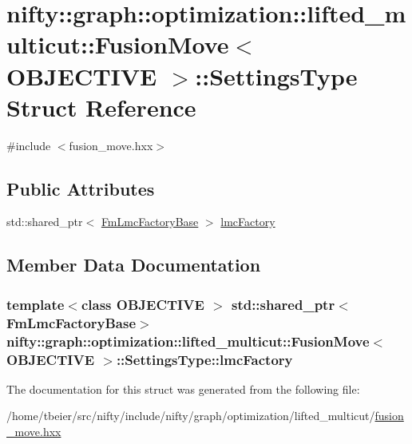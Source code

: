 \hypertarget{structnifty_1_1graph_1_1optimization_1_1lifted__multicut_1_1FusionMove_1_1SettingsType}{}\section{nifty\+:\+:graph\+:\+:optimization\+:\+:lifted\+\_\+multicut\+:\+:Fusion\+Move$<$ O\+B\+J\+E\+C\+T\+I\+V\+E $>$\+:\+:Settings\+Type Struct Reference}
\label{structnifty_1_1graph_1_1optimization_1_1lifted__multicut_1_1FusionMove_1_1SettingsType}


{\ttfamily \#include $<$fusion\+\_\+move.\+hxx$>$}

\subsection*{Public Attributes}
\begin{DoxyCompactItemize}
\item 
std\+::shared\+\_\+ptr$<$ \hyperlink{classnifty_1_1graph_1_1optimization_1_1lifted__multicut_1_1FusionMove_ab8f8704d7ac394b6af5fba1341cc5a94}{Fm\+Lmc\+Factory\+Base} $>$ \hyperlink{structnifty_1_1graph_1_1optimization_1_1lifted__multicut_1_1FusionMove_1_1SettingsType_a1ca2984552d6c54b8e014e01afbebc7e}{lmc\+Factory}
\end{DoxyCompactItemize}


\subsection{Member Data Documentation}
\hypertarget{structnifty_1_1graph_1_1optimization_1_1lifted__multicut_1_1FusionMove_1_1SettingsType_a1ca2984552d6c54b8e014e01afbebc7e}{}
\subsubsection[{lmc\+Factory}]{\setlength{\rightskip}{0pt plus 5cm}template$<$class O\+B\+J\+E\+C\+T\+I\+V\+E $>$ std\+::shared\+\_\+ptr$<${\bf Fm\+Lmc\+Factory\+Base}$>$ {\bf nifty\+::graph\+::optimization\+::lifted\+\_\+multicut\+::\+Fusion\+Move}$<$ O\+B\+J\+E\+C\+T\+I\+V\+E $>$\+::Settings\+Type\+::lmc\+Factory}\label{structnifty_1_1graph_1_1optimization_1_1lifted__multicut_1_1FusionMove_1_1SettingsType_a1ca2984552d6c54b8e014e01afbebc7e}


The documentation for this struct was generated from the following file\+:\begin{DoxyCompactItemize}
\item 
/home/tbeier/src/nifty/include/nifty/graph/optimization/lifted\+\_\+multicut/\hyperlink{lifted__multicut_2fusion__move_8hxx}{fusion\+\_\+move.\+hxx}\end{DoxyCompactItemize}
